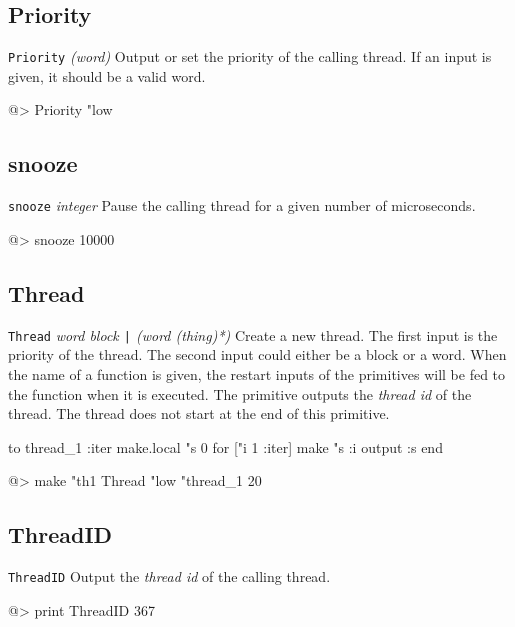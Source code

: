 \subsection*{Priority} 

{\tt Priority} {\it (word)}
\newline\newline
Output or set the priority of the calling thread. If an input is given, it should be a valid word.
\begin{verbatimtab}
@> Priority "low
\end{verbatimtab}

\subsection*{snooze} 

{\tt snooze} {\it integer}
\newline\newline
Pause the calling thread for a given number of microseconds.
\begin{verbatimtab}
@> snooze 10000
\end{verbatimtab}

\subsection*{Thread} 

{\tt Thread} {\it word block \verb+|+ (word (thing)*)}
\newline\newline
Create a new thread. The first input is the priority of the thread. The second input could either be a block or a word. When the name of a function is given, the restart inputs of the primitives will be fed to the function when it is executed. The primitive outputs the {\em thread id} of the thread. The thread does not start at the end of this primitive.
\begin{verbatimtab}
to thread_1 :iter
	make.local "s 0
	for ["i 1 :iter] {
		make "s :i		
	}
	output :s
end

@> make "th1 Thread "low "thread_1 20
\end{verbatimtab}

\subsection*{ThreadID} 

{\tt ThreadID}
\newline\newline
Output the {\em thread id} of the calling thread.
\begin{verbatimtab}
@> print ThreadID
367
\end{verbatimtab}

